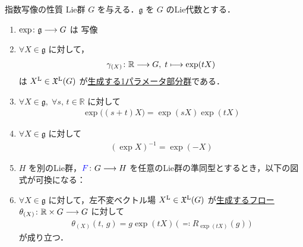 \documentclass[TQFT_main]{subfiles}
\begin{document}
\begin{myprop}[label=prop:exp]{指数写像の性質}
    Lie群 $G$ を与える．$\mathfrak{g}$ を $G$ のLie代数とする．
    \begin{enumerate}
        \item $\exp \colon \mathfrak{g} \longrightarrow G$ は \cinfty 写像 
        \item $\forall X \in \mathfrak{g}$ に対して，
        \begin{align}
            \gamma_{(X)} \colon \mathbb{R} \longrightarrow G,\; t \longmapsto \exp (tX)
        \end{align}
        は $X^{\mathrm{L}} \in \mathfrak{X}^{\mathrm{L}}(G)$ が\hyperref[prop:one-parameter-basic]{生成する1パラメータ部分群}である．
        \item $\forall X \in \mathfrak{g},\; \forall s,\, t \in \mathbb{R}$ に対して
        \begin{align}
            \exp \bigl( (s+t) X\bigr) = \exp (sX) \exp(tX)
        \end{align}
        
        \item $\forall X \in \mathfrak{g}$ に対して
        \begin{align}
            (\exp X)^{-1} = \exp (-X)
        \end{align}
        

        \item $H$ を別のLie群，$\textcolor{blue}{F} \colon G \longrightarrow H$ を任意のLie群の準同型とするとき，以下の図式が可換になる：
        \begin{center}
        \end{center}
        
        \item $\forall X \in \mathfrak{g}$ に対して，左不変ベクトル場 $X^{\mathrm{L}} \in \mathfrak{X}^{\mathrm{L}}(G)$ が\hyperref[thm:fundamental-flow]{生成するフロー} $\theta_{(X)} \colon \mathbb{R} \times G \longrightarrow G$ に対して 
        \begin{align}
            \theta_{(X)}(t,\, g) = g \exp(tX) \, \bigl(\,\eqqcolon R_{\exp(tX)}(g)\,\bigr)
        \end{align}
        が成り立つ．
    \end{enumerate}
\end{myprop}
\end{document}
